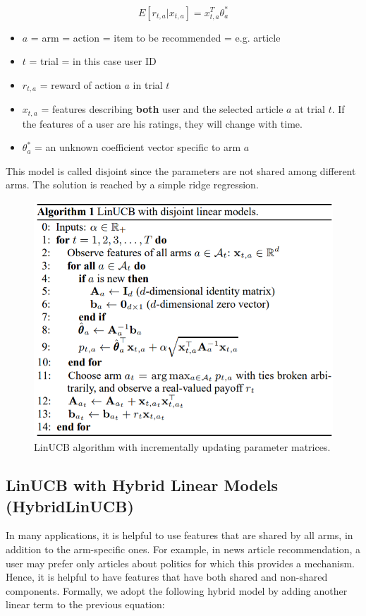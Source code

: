 \documentclass[12pt, titlepage]{article}
\begin{document}
$$
E[r_{t,a}|x_{t,a}] = x^T_{t,a}\theta^*_a
$$

\begin{itemize}
\item $a$ = arm = action = item to be recommended = e.g. article
\item $t$ = trial = in this case user ID
\item $r_{t,a}$ = reward of action $a$ in trial $t$ 
\item $x_{t,a}$ = features describing \textbf{both} user and the selected article $a$ at trial $t$. If the features of a user are his ratings, they will change with time.
\item $\theta^*_a$ = an unknown coefficient vector specific to arm $a$
\end{itemize}

This model is called disjoint since the parameters are not shared among different arms.
The solution is reached by a simple ridge regression.

\begin{figure}[h]
 \centering
 \includegraphics[scale=0.9]{img/LinUCB_alg}
 \caption{LinUCB algorithm with incrementally updating parameter matrices.}
 \label{fig:linUCB_alg}
\end{figure}

\subsection{LinUCB with Hybrid Linear Models (HybridLinUCB)}

In many applications, it is helpful to use features
that are shared by all arms, in addition to the arm-specific ones. For
example, in news article recommendation, a user may prefer only
articles about politics for which this provides a mechanism. Hence,
it is helpful to have features that have both shared and non-shared
components. Formally, we adopt the following hybrid model by
adding another linear term to the previous equation:
\end{document}

